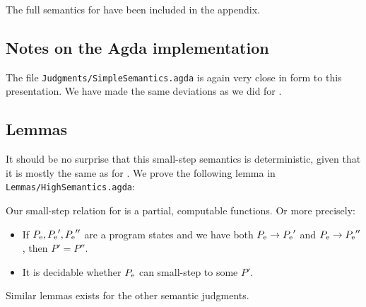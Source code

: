The full semantics for \ATALe have been included in the appendix.

\subsection{Notes on the Agda implementation}

The file \texttt{Judgments/SimpleSemantics.agda} is again very close in form to
this presentation. We have made the same deviations as we did for \ATAL.

\subsection{Lemmas}

It should be no surprise that this small-step semantics is deterministic, given
that it is mostly the same as for \ATAL. We prove the following lemma in
\texttt{Lemmas/HighSemantics.agda}:

\begin{lemma}
  \label{lemma:computsimple}
  Our small-step relation for \ATALe is a partial, computable functions. Or more
  precisely:

  \begin{itemize}
  \item If ${{P}_{\mathrm{e}}}, {{P}_{\mathrm{e}}}', {{P}_{\mathrm{e}}}''$ are a program states and we have both
    ${{{P}_{\mathrm{e}}}} -> {{{P}_{\mathrm{e}}}'}$ and ${{{P}_{\mathrm{e}}}} -> {{{P}_{\mathrm{e}}}''}$, then
    $P' = P''$.
  \item It is decidable whether ${{P}_{\mathrm{e}}}$ can small-step to some $P'$.
  \end{itemize}

  Similar lemmas exists for the other semantic judgments.
\end{lemma}
